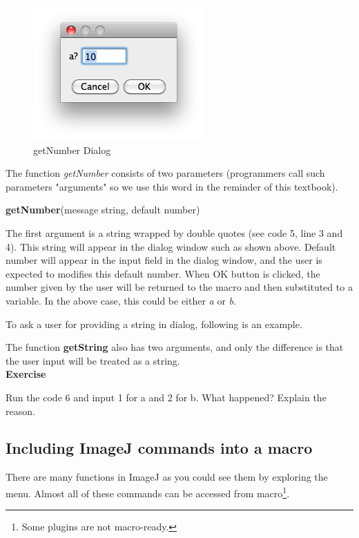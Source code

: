 \documentclass[11pt,a4paper,oneside]{report}
\newenvironment{indentexercise}[1]%
{{\setlength{\leftmargin}{2em}}%
\textbf{Exercise \thesubsection-#1}%
\begin{list}{}%
	\item%
}
{\end{list}}
\newenvironment{indentCom}%
{\begin{list}{}%
         {\setlength{\leftmargin}{1em}}%
         \item[]%
}
{\end{list}}
\begin{document}
\begin{figure}[htbp]
\begin{center}
\includegraphics[scale=0.6]{fig/getNumberDialog.png}
\caption{getNumber Dialog} \label{fig_getNUmber}
\end{center}
\end{figure}

The function \textit{getNumber} consists of two parameters (programmers call such parameters "arguments" so we use this word in the reminder of this textbook).
\begin{indentCom}
\textbf{getNumber}(message string, default number)
\end{indentCom}
The first argument is a string wrapped by double quotes (see code 5, line 3
and 4). This string will appear in the dialog window such as shown above. 
Default number will appear in the input field in the dialog window, 
and the user is expected to modifies this default number. 
When OK button is clicked, the number given by the user will be returned to
the macro and then substituted to a variable. In the above case, this could be
either \textit{a} or \textit{b}.
 
To ask a user for providing a string in dialog, following is an example. 


The function \textbf{getString} also has two arguments, 
and only the difference is that the user input will be treated as a string. \\

\begin{indentexercise}{1}
Run the code 6 and input 1 for a and 2 for b. What happened? Explain the reason. 
\end{indentexercise}

\subsection{Including ImageJ commands into a macro}
There are many functions in ImageJ as you could see them by exploring the menu.
Almost all of these commands can be accessed from macro\footnote{Some plugins
are not macro-ready.}.
\end{document}
